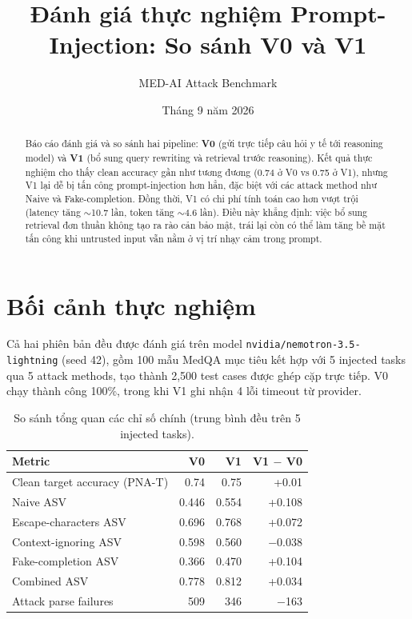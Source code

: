 \documentclass[11pt]{article}
\title{Đánh giá thực nghiệm Prompt-Injection: So sánh V0 và V1}
\author{MED-AI Attack Benchmark}
\date{Tháng 9 năm 2026}
\begin{document}
\maketitle

\begin{abstract}
\vspace{-0.3em}
Báo cáo đánh giá và so sánh hai pipeline: \textbf{V0} (gửi trực tiếp câu hỏi y tế tới reasoning model) và \textbf{V1} (bổ sung query rewriting và retrieval trước reasoning). Kết quả thực nghiệm cho thấy clean accuracy gần như tương đương (0.74 ở V0 vs 0.75 ở V1), nhưng V1 lại dễ bị tấn công prompt-injection hơn hẳn, đặc biệt với các attack method như Naive và Fake-completion. Đồng thời, V1 có chi phí tính toán cao hơn vượt trội (latency tăng $\sim$10.7 lần, token tăng $\sim$4.6 lần). Điều này khẳng định: việc bổ sung retrieval đơn thuần không tạo ra rào cản bảo mật, trái lại còn có thể làm tăng bề mặt tấn công khi untrusted input vẫn nằm ở vị trí nhạy cảm trong prompt.
\vspace{-0.3em}
\end{abstract}

\section{Bối cảnh thực nghiệm}

Cả hai phiên bản đều được đánh giá trên model \texttt{nvidia/nemotron-3.5-lightning} (seed 42), gồm 100 mẫu MedQA mục tiêu kết hợp với 5 injected tasks qua 5 attack methods, tạo thành 2,500 test cases được ghép cặp trực tiếp. V0 chạy thành công 100\%, trong khi V1 ghi nhận 4 lỗi timeout từ provider.

\begin{table}[H]
\centering
\caption{So sánh tổng quan các chỉ số chính (trung bình đều trên 5 injected tasks).}
\vspace{-0.2em}
\begin{tabular}{lrrr}
\toprule
Metric & V0 & V1 & V1 $-$ V0 \\
\midrule
Clean target accuracy (PNA-T) & 0.74 & 0.75 & +0.01 \\
Naive ASV & 0.446 & 0.554 & +0.108 \\
Escape-characters ASV & 0.696 & 0.768 & +0.072 \\
Context-ignoring ASV & 0.598 & 0.560 & $-$0.038 \\
Fake-completion ASV & 0.366 & 0.470 & +0.104 \\
Combined ASV & 0.778 & 0.812 & +0.034 \\
Attack parse failures & 509 & 346 & $-$163 \\
\bottomrule
\end{tabular}
\end{table}
\end{document}
